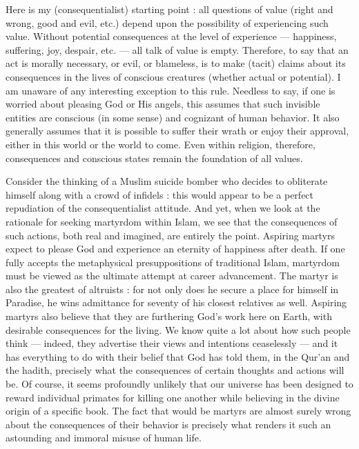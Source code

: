 \documentclass[a4paper,14pt]{extarticle}
\begin{document}
Here is my (consequentialist) starting point :
all questions of value (right and wrong, good and evil, etc.) depend upon the possibility of experiencing such value.
Without potential consequences at the level of experience --- happiness, suffering, joy, despair, etc. --- all talk of value is empty.
Therefore, to say that an act is morally necessary, or evil, or blameless, is to make (tacit) claims about its consequences in the lives of conscious creatures (whether actual or potential).
I am unaware of any interesting exception to this rule.
Needless to say, if one is worried about pleasing God or His angels, this assumes that such invisible entities are conscious (in some sense) and cognizant of human behavior.
It also generally assumes that it is possible to suffer their wrath or enjoy their approval, either in this world or the world to come.
Even within religion, therefore, consequences and conscious states remain the foundation of all values.

Consider the thinking of a Muslim suicide bomber who decides to obliterate himself along with a crowd of infidels :
this would appear to be a perfect repudiation of the consequentialist attitude.
And yet, when we look at the rationale for seeking martyrdom within Islam, we see that the consequences of such actions, both real and imagined, are entirely the point.
Aspiring martyrs expect to please God and experience an eternity of happiness after death.
If one fully accepts the metaphysical presuppositions of traditional Islam, martyrdom must be viewed as the ultimate attempt at career advancement.
The martyr is also the greatest of altruists :
for not only does he secure a place for himself in Paradise, he wins admittance for seventy of his closest relatives as well.
Aspiring martyrs also believe that they are furthering God's work here on Earth, with desirable consequences for the living.
We know quite a lot about how such people think --- indeed, they advertise their views and intentions ceaselessly --- and it has everything to do with their belief that God has told them, in the Qur'an and the hadith, precisely what the consequences of certain thoughts and actions will be.
Of course, it seems profoundly unlikely that our universe has been designed to reward individual primates for killing one another while believing in the divine origin of a specific book.
The fact that would be martyrs are almost surely wrong about the consequences of their behavior is precisely what renders it such an astounding and immoral misuse of human life.
\end{document}
